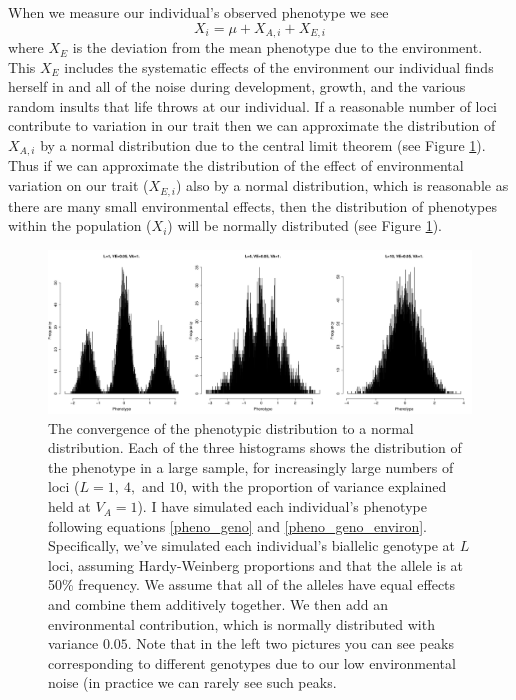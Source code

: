 When we measure our individual's observed phenotype we see
\begin{equation}
X_i =   \mu+X_{A,i} + X_{E,i} \label{pheno_geno_environ}
\end{equation}
where $X_E$ is the deviation from the mean phenotype due to the
environment. This $X_E$ includes the systematic effects of the environment
our individual finds herself in and all of the noise during
development, growth, and the various random insults that life throws
at our individual. If a reasonable number of loci contribute to
variation in our trait then we can approximate the distribution of
$X_{A,i}$ by a normal distribution due to the central limit theorem (see Figure \ref{fig:QT1}). Thus if we can
approximate the distribution of the effect of environmental variation
on our trait ($X_{E,i}$) also by a normal distribution, which is
reasonable as there are many small environmental effects, then the
distribution of phenotypes within the population ($X_i$) will be
normally distributed (see Figure \ref{fig:QT1}).\\

\begin{figure}
\begin{center}
\includegraphics[width=\textwidth]{figures/QT1.png}
\end{center}
\caption{The convergence of the phenotypic distribution to a normal
  distribution. Each of the three histograms shows the distribution of
the phenotype in a large sample, for increasingly large numbers of loci ($L=1,~4,$ and $10$, with the proportion of variance explained held at $V_A=1$). I have simulated each individual's
phenotype following equations \ref{pheno_geno} and \ref{pheno_geno_environ}. Specifically, we've simulated each
individual's biallelic genotype at $L$ loci, assuming Hardy-Weinberg proportions
and that the allele is at 50\% frequency. We assume that all of the
alleles have equal effects and combine them additively together. We then add an environmental contribution, which is normally distributed with variance $0.05$. Note that in the left two pictures you can see peaks
corresponding to different genotypes due to our low  environmental noise (in practice we can rarely see such peaks.} \label{fig:QT1}
\end{figure}

